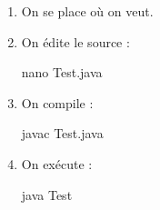 \documentclass[a4paper,11pt]{article}
\begin{document}
            \par
        
			\begin{enumerate}
				
				\item On se place o\`u on veut.
				
				\item On \'edite le source : 
					\begin{Console}
						nano Test.java
					\end{Console}
				\item On compile : 
					\begin{Console}
						javac Test.java
					\end{Console}
				\item On ex\'ecute :
					 \begin{Console}
					 	java Test
					\end{Console}
			\end{enumerate}
				
\end{document}
